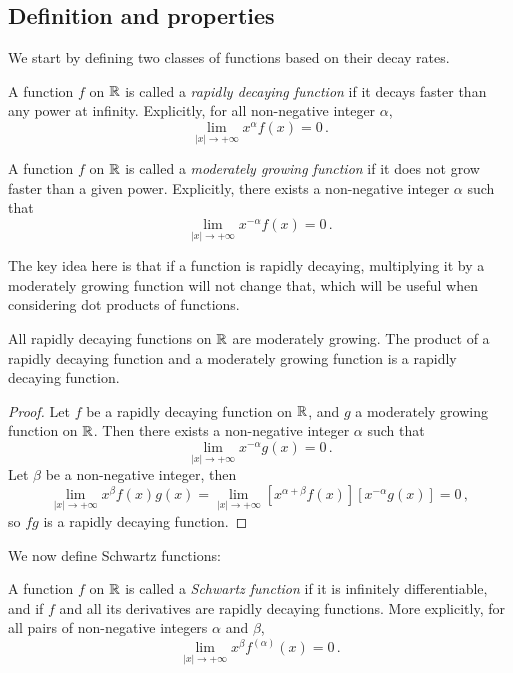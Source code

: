 \subsection{Definition and properties}
We start by defining two classes of functions based on their decay rates.
\begin{definition}
  A function $f$ on $\mathbb{R}$ is called a \emph{rapidly decaying function} if it decays faster
  than any power at infinity. Explicitly, for all non-negative integer $\alpha$,
  \begin{equation}
    \lim_{|x|\to+\infty}x^\alpha f(x)=0\,.
  \end{equation}
\end{definition}
\begin{definition}
  A function $f$ on $\mathbb{R}$ is called a \emph{moderately growing function} if it does not
  grow faster than a given power. Explicitly, there exists a non-negative integer $\alpha$
  such that
  \begin{equation}
    \lim_{|x|\to+\infty}x^{-\alpha}f(x)=0\,.
  \end{equation}
\end{definition}
The key idea here is that if a function is rapidly decaying, multiplying it by a
moderately growing function will not change that, which will be useful when considering
dot products of functions.
\begin{proposition}
  \label{prop:rapid-times-moderate}
  All rapidly decaying functions on $\mathbb{R}$ are moderately growing. The product of a rapidly
  decaying function and a moderately growing function is a rapidly decaying function.
\end{proposition}
\begin{proof}
  Let $f$ be a rapidly decaying function on $\mathbb{R}$, and $g$ a moderately growing function on
  $\mathbb{R}$. Then there exists a non-negative integer $\alpha$ such that
  \begin{equation}
    \lim_{|x|\to+\infty}x^{-\alpha}g(x)=0\,.
  \end{equation}
  Let $\beta$ be a non-negative integer, then
  \begin{equation}
    \lim_{|x|\to+\infty}x^\beta f(x)g(x)=
    \lim_{|x|\to+\infty}[x^{\alpha+\beta} f(x)][x^{-\alpha}g(x)]=0\,,
  \end{equation}
  so $fg$ is a rapidly decaying function.
\end{proof}
We now define Schwartz functions:
\begin{definition}
  \label{def:schwartz-fn}
  A function $f$ on $\mathbb{R}$ is called a \emph{Schwartz function} if it is infinitely
  differentiable, and if $f$ and all its derivatives are rapidly decaying functions. More
  explicitly, for all pairs of non-negative integers $\alpha$ and $\beta$,
  \begin{equation}
    \lim_{|x|\to+\infty}x^\beta f^{(\alpha)}(x)=0\,.
  \end{equation}
\end{definition}
